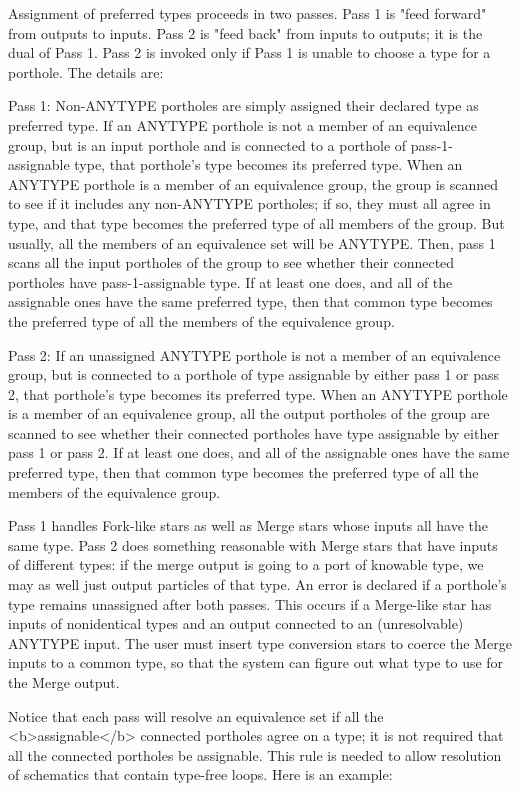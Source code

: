 Assignment of preferred types proceeds in two passes.  Pass 1 is "feed
forward" from outputs to inputs.  Pass 2 is "feed back" from inputs to
outputs; it is the dual of Pass 1.  Pass 2 is invoked only if Pass 1 is
unable to choose a type for a porthole.  The details are:

Pass 1: Non-ANYTYPE portholes are simply assigned their declared type as
preferred type.  If an ANYTYPE porthole is not a member of an equivalence
group, but is an input porthole and is connected to a porthole of
pass-1-assignable type, that porthole's type becomes its preferred type.
When an ANYTYPE porthole is a member of an equivalence group, the group is
scanned to see if it includes any non-ANYTYPE portholes; if so, they must all
agree in type, and that type becomes the preferred type of all members of the
group.  But usually, all the members of an equivalence set will be ANYTYPE.
Then, pass 1 scans all the input portholes of the group to see whether their
connected portholes have pass-1-assignable type.  If at least one does, and
all of the assignable ones have the same preferred type, then that common
type becomes the preferred type of all the members of the equivalence group.

Pass 2: If an unassigned ANYTYPE porthole is not a member of an equivalence
group, but is connected to a porthole of type assignable by either pass 1 or
pass 2, that porthole's type becomes its preferred type.  When an ANYTYPE
porthole is a member of an equivalence group, all the output portholes of the
group are scanned to see whether their connected portholes have type
assignable by either pass 1 or pass 2.  If at least one does, and all of the
assignable ones have the same preferred type, then that common type becomes
the preferred type of all the members of the equivalence group.

Pass 1 handles Fork-like stars as well as Merge stars whose inputs all have
the same type.  Pass 2 does something reasonable with Merge stars that have
inputs of different types: if the merge output is going to a port of knowable
type, we may as well just output particles of that type.  An error is
declared if a porthole's type remains unassigned after both passes.  This
occurs if a Merge-like star has inputs of nonidentical types and an output
connected to an (unresolvable) ANYTYPE input.  The user must insert type
conversion stars to coerce the Merge inputs to a common type, so that the
system can figure out what type to use for the Merge output.

Notice that each pass will resolve an equivalence set if all the
<b>assignable</b> connected portholes agree on a type; it is not required
that all the connected portholes be assignable.  This rule is needed to allow
resolution of schematics that contain type-free loops.  Here is an example:

